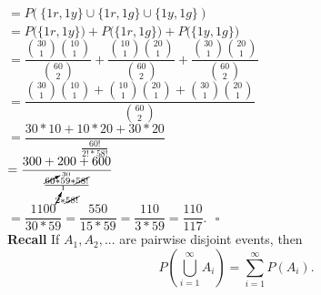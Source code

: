 \documentclass[12pt]{book}
\begin{document}
$= P\big(   ~\{1r,1y\} \cup \{1r,1g\} \cup \{1y,1g\}~   \big)$\\

$=P\big(  \{1r,1y\}  \big) + P\big(  \{1r,1g\}  \big) + P\big(  \{1y,1g\}  \big)$\\

$=\dfrac{{30\choose1}{10\choose1}}{{60\choose2}} + \dfrac{{10\choose1}{20\choose1}}{{60\choose2}} + \dfrac{{30\choose1}{20\choose1}}{{60\choose2}}$\\

$=\dfrac{{30\choose1}{10\choose1}+{10\choose1}{20\choose1}+{30\choose1}{20\choose1}}{{60\choose2}}$\\

$=\dfrac{30*10+10*20+30*20}{\frac{60!}{2!*58!}}$\\

$= \dfrac{300+200+600}{    \frac   {\cancelto{30}{60} *59*\cancel{58!}}  {\cancelto{1}{2} *\cancel{58!}    }      }$ \\

$= \dfrac{1100}{30*59} = \dfrac{550}{15*59} = \dfrac{110}{3*59}=\dfrac{110}{117}.~~~\square$\\

\noindent \textbf{Recall} If $A_{1},A_{2}, ...$ are pairwise disjoint events, then $$P\left(\bigcup\limits_{i=1}^{\infty}A_{i}\right) = \sum\limits_{i=1}^{\infty}P(A_{i}).$$
\end{document}
